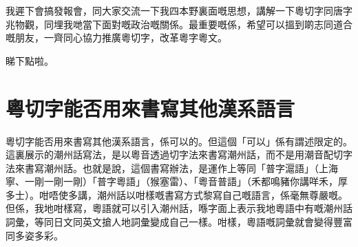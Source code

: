 我遲下會搞發報會，同大家交流一下我四本野裏面嘅思想，講解一下粵切字同唐字兆物觀，同埋我哋當下面對嘅政治嘅關係。最重要嘅係，希望可以搵到啲志同道合嘅朋友，一齊同心協力推廣粵切字，改革粵字粵文。

睇下點啦。



\section{粵切字能否用來書寫其他漢系語言}
粵切字能否用來書寫其他漢系語言，係可以的。但這個「可以」係有謂述限定的。這裏展示的潮州話寫法，是以粵音透過切字法來書寫潮州話，而不是用潮音配切字法來書寫潮州話。也就是說，這個書寫辦法，是運作上等同「普字滬語」（上海寧、一剛一剛一剛）「普字粵語」（猴塞雷）、「粵音普語」（禾都鳴豬你講咩禾，厚多士）。咁唔使多講，潮州話以咁樣嘅書寫方式黎寫自己嘅語言，係毫無尊嚴嘅。但係，我地咁樣寫，粵語就可以引入潮州話，喺字面上表示我地粵語中有嘅潮州話詞彙，等同日文同英文搶人地詞彙變成自己一樣。咁樣，粵語嘅詞彙就會變得豐富同多姿多彩。

